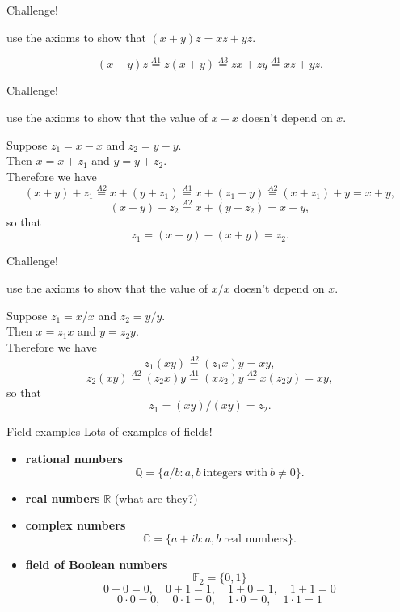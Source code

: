 \documentclass{beamer}
\begin{document}
\begin{frame}{Challenge!}
\begin{prob}
use the axioms to show that $(x+y)z = xz + yz$.
\end{prob}
\pause
\begin{soln}
$$(x+y)z \stackrel{A1}{=} z(x+y) \stackrel{A3}{=} zx + zy \stackrel{A1}{=} xz + yz.$$
\end{soln}
\end{frame}

\begin{frame}{Challenge!}
\begin{prob}
use the axioms to show that the value of $x-x$ doesn't depend on $x$.
\end{prob}
\pause
\begin{soln}
Suppose $z_1=x-x$ and $z_2=y-y$.\\
\pause
Then $x = x+z_1$ and $y=y+z_2$.\\
\pause
Therefore we have
$$(x+y)+z_1\stackrel{A2}{=}x+(y+z_1)\stackrel{A1}{=}x+(z_1+y)\stackrel{A2}{=}(x+z_1) + y=x+y,$$
\pause
$$(x+y)+z_2\stackrel{A2}{=}x+(y+z_2)=x+y,$$
\pause
so that
$$z_1 = (x+y)-(x+y) = z_2.$$
\end{soln}
\end{frame}

\begin{frame}{Challenge!}
\begin{prob}
use the axioms to show that the value of $x/x$ doesn't depend on $x$.
\end{prob}
\pause
\begin{soln}
Suppose $z_1=x/x$ and $z_2=y/y$.\\
\pause
Then $x = z_1x$ and $y=z_2y$.\\
\pause
Therefore we have
$$z_1(xy) \stackrel{A2}{=} (z_1x)y = xy,$$
\pause
$$z_2(xy) \stackrel{A2}{=} (z_2x)y \stackrel{A1}{=} (xz_2)y \stackrel{A2}{=} x(z_2y) = xy,$$
\pause
so that
$$z_1 = (xy)/(xy) = z_2.$$
\end{soln}
\end{frame}

\begin{frame}{Field examples}
Lots of examples of fields!
\begin{itemize}
\pause
\item \textbf{rational numbers}
$$\mathbb{Q} = \{ a/b: a,b\ \text{integers with}\ b\neq 0\}.$$
\pause
\item \textbf{real numbers} $\mathbb{R}$ (what are they?)
\pause
\item \textbf{complex numbers}
$$\mathbb{C} = \{ a + ib: a,b\ \text{real numbers}\}.$$
\pause
\item \textbf{field of Boolean numbers}
$$\mathbb{F}_2 = \{0,1\}$$
$$0+0 = 0,\quad 0+1 = 1,\quad 1+0 = 1,\quad 1+1 = 0$$
$$0\cdot 0 = 0,\quad 0\cdot1 = 0,\quad 1\cdot0 = 0,\quad 1\cdot1 = 1$$
\end{itemize}
\end{frame}
\end{document}
